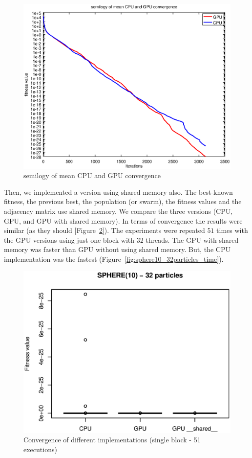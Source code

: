 \documentclass{article}
\begin{document}
    \begin{figure}[!htb]
        \centering
        \includegraphics[width=.7\textwidth]{../img/semilogy_convergence.eps}
        \caption{semilogy of mean CPU and GPU convergence}
        \label{fig:semilogy_convergence}
    \end{figure}

    Then, we implemented a version using shared memory also.
    The best-known fitness, the previous best, the population (or swarm), the fitness values and the adjacency matrix use shared memory.
    We compare the three versions (CPU, GPU, and GPU with shared memory). In terms of convergence the results were similar (as they should [Figure~\ref{fig:sphere10_32particles_fitness}]).
    The experiments were repeated $51$ times with the GPU versions using just one block with 32 threads. The GPU with shared memory was faster than GPU without using shared memory. But, the CPU implementation was the fastest (Figure~\ref{fig:sphere10_32particles_time}).


    \begin{figure}[!htb]
        \centering
        \includegraphics[width=.7\textwidth]{../img/sphere10_32particles_fitness.eps}
        \caption{Convergence of different implementations (single block - 51 executions)}
        \label{fig:sphere10_32particles_fitness}
    \end{figure}
\end{document}
